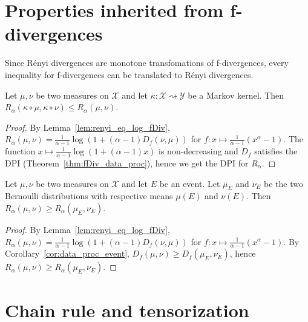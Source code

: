 \section{Properties inherited from f-divergences}

Since Rényi divergences are monotone transfomations of f-divergences, every inequality for f-divergences can be translated to Rényi divergences.

\begin{theorem}
  \label{thm:renyi_data_proc}
  Let $\mu, \nu$ be two measures on $\mathcal X$ and let $\kappa : \mathcal X \rightsquigarrow \mathcal Y$ be a Markov kernel.
  Then $R_\alpha(\kappa \circ \mu, \kappa \circ \nu) \le R_\alpha(\mu, \nu)$.
\end{theorem}

\begin{proof}
By Lemma~\ref{lem:renyi_eq_log_fDiv}, $R_\alpha(\mu, \nu) = \frac{1}{\alpha - 1} \log (1 + (\alpha - 1) D_f(\nu, \mu))$ for $f : x \mapsto \frac{1}{\alpha - 1}(x^{\alpha} - 1)$.
The function $x \mapsto \frac{1}{\alpha - 1}\log (1 + (\alpha - 1)x)$ is non-decreasing and $D_f$ satisfies the DPI (Theorem~\ref{thm:fDiv_data_proc}), hence we get the DPI for $R_\alpha$.
\end{proof}

\begin{lemma}
  \label{lem:renyi_data_proc_event}
  Let $\mu, \nu$ be two measures on $\mathcal X$ and let $E$ be an event. Let $\mu_E$ and $\nu_E$ be the two Bernoulli distributions with respective means $\mu(E)$ and $\nu(E)$.
  Then $R_\alpha(\mu, \nu) \ge R_\alpha(\mu_E, \nu_E)$.
\end{lemma}

\begin{proof}
By Lemma~\ref{lem:renyi_eq_log_fDiv}, $R_\alpha(\mu, \nu) = \frac{1}{\alpha - 1} \log (1 + (\alpha - 1) D_f(\nu, \mu))$ for $f : x \mapsto \frac{1}{\alpha - 1}(x^{\alpha} - 1)$.
By Corollary~\ref{cor:data_proc_event}, $D_f(\mu, \nu) \ge D_f(\mu_E, \nu_E)$, hence $R_\alpha(\mu, \nu) \ge R_\alpha(\mu_E, \nu_E)$.
\end{proof}

\section{Chain rule and tensorization}

